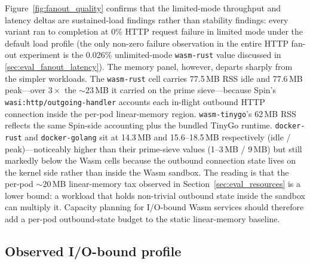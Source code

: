 \begin{sloppypar}
Figure~\ref{fig:fanout_quality} confirms that the limited-mode throughput and latency deltas are sustained-load findings rather than stability findings: every variant ran to completion at 0\% \acs{HTTP} request failure in limited mode under the default load profile (the only non-zero failure observation in the entire HTTP fan-out experiment is the 0.026\% unlimited-mode \texttt{wasm-rust} value discussed in \ref{sec:eval_fanout_latency}). The memory panel, however, departs sharply from the simpler workloads. The \texttt{wasm-rust} cell carries 77.5\,\acs{MB} \acs{RSS} idle and 77.6\,\acs{MB} peak---over $3\times$ the ${\sim}23$\,MB it carried on the prime sieve---because Spin's \texttt{wasi:http/outgoing-handler} accounts each in-flight outbound \acs{HTTP} connection inside the per-pod linear-memory region. \texttt{wasm-tinygo}'s 62\,\acs{MB} \acs{RSS} reflects the same Spin-side accounting plus the bundled TinyGo runtime. \texttt{docker-rust} and \texttt{docker-golang} sit at 14.3\,\acs{MB} and 15.6--18.5\,\acs{MB} respectively (idle / peak)---noticeably higher than their prime-sieve values (1--3\,\acs{MB} / 9\,\acs{MB}) but still markedly below the \acs{Wasm} cells because the outbound connection state lives on the kernel side rather than inside the \acs{Wasm} sandbox. The reading is that the per-pod ${\sim}20$\,\acs{MB} linear-memory tax observed in Section~\ref{sec:eval_resources} is a lower bound: a workload that holds non-trivial outbound state inside the sandbox can multiply it. Capacity planning for I/O-bound \acs{Wasm} services should therefore add a per-pod outbound-state budget to the static linear-memory baseline.
\end{sloppypar}

\subsection{Observed I/O-bound profile}
\label{sec:eval_fanout_profile}

